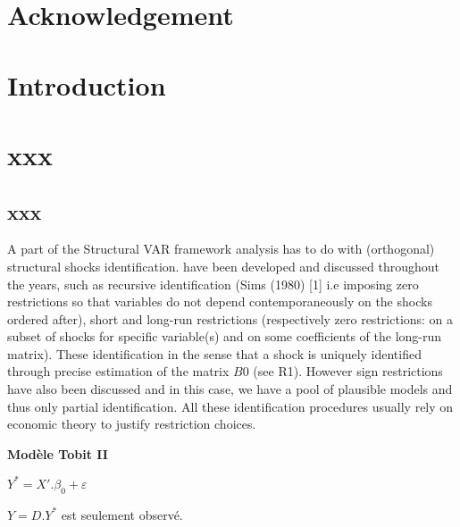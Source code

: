 \documentclass[12pt]{article}
\begin{document}



\pagestyle{fancy}
\fancyhead[L]{}
\fancyhead[R]{}
\thispagestyle{empty}
\tableofcontents
\break
\setcounter{page}{1}


\section*{Acknowledgement}
\lipsum[1]
\newpage
\section*{Introduction}
\lipsum[1]
\newpage


\pagestyle{fancy}
\fancyhead[L]{\small{\leftmark}}
\fancyhead[R]{}

\section{xxx}

\lipsum[1]

\subsection{xxx}

\quad A  part of the Structural VAR framework analysis has to do with (orthogonal)
structural shocks identification.  have been developed and discussed
throughout the years, such as recursive identification (Sims (1980) [1] i.e imposing zero
restrictions so that variables do not depend contemporaneously on the shocks ordered
after), short and long-run restrictions (respectively zero restrictions: on a subset of
shocks for specific variable(s) and on some coefficients of the long-run matrix). These
identification  in the sense that a shock is uniquely
identified through precise estimation of the matrix $B0$ (see R1). However sign restrictions
have also been discussed and in this case, we have a pool of plausible models and thus
only partial identification. All these identification procedures usually rely on economic
theory to justify restriction choices.
\bigbreak
\begin{boxH}
    \textbf{Modèle Tobit II}\par
    \quad $ Y^{*} = X'.\beta_{0} + \varepsilon $ \quad {}\par
    \quad $Y = D.Y^{*}$ est seulement observé.
\end{boxH}
\end{document}
